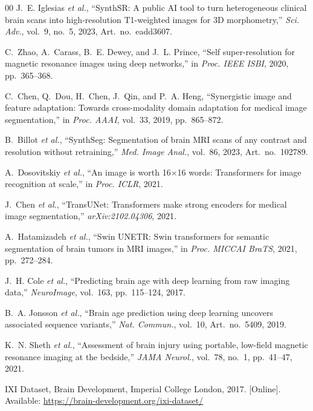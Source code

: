 \documentclass[12pt,a4paper]{article}
\begin{document}
\begin{thebibliography}{00}
J.~E. Iglesias \emph{et al.},
``SynthSR: A public AI tool to turn heterogeneous clinical brain scans
into high-resolution T1-weighted images for 3D morphometry,''
\emph{Sci. Adv.}, vol.~9, no.~5, 2023, Art.~no.~eadd3607.

C.~Zhao, A.~Carass, B.~E. Dewey, and J.~L. Prince,
``Self super-resolution for magnetic resonance images using deep
networks,''
in \emph{Proc. IEEE ISBI}, 2020, pp.~365--368.

C.~Chen, Q.~Dou, H.~Chen, J.~Qin, and P.~A. Heng,
``Synergistic image and feature adaptation: Towards cross-modality
domain adaptation for medical image segmentation,''
in \emph{Proc. AAAI}, vol.~33, 2019, pp.~865--872.

B.~Billot \emph{et al.},
``SynthSeg: Segmentation of brain MRI scans of any contrast and
resolution without retraining,''
\emph{Med. Image Anal.}, vol.~86, 2023, Art.~no.~102789.

A.~Dosovitskiy \emph{et al.},
``An image is worth 16$\times$16 words: Transformers for image
recognition at scale,''
in \emph{Proc. ICLR}, 2021.

J.~Chen \emph{et al.},
``TransUNet: Transformers make strong encoders for medical image
segmentation,''
\emph{arXiv:2102.04306}, 2021.

A.~Hatamizadeh \emph{et al.},
``Swin UNETR: Swin transformers for semantic segmentation of brain
tumors in MRI images,''
in \emph{Proc. MICCAI BraTS}, 2021, pp.~272--284.

J.~H. Cole \emph{et al.},
``Predicting brain age with deep learning from raw imaging data,''
\emph{NeuroImage}, vol.~163, pp.~115--124, 2017.

B.~A. Jonsson \emph{et al.},
``Brain age prediction using deep learning uncovers associated
sequence variants,''
\emph{Nat. Commun.}, vol.~10, Art.~no.~5409, 2019.

K.~N. Sheth \emph{et al.},
``Assessment of brain injury using portable, low-field magnetic resonance
imaging at the bedside,''
\emph{JAMA Neurol.}, vol.~78, no.~1, pp.~41--47, 2021.

IXI Dataset, Brain Development, Imperial College London, 2017.
[Online]. Available: \url{https://brain-development.org/ixi-dataset/}


\end{thebibliography}
\end{document}
